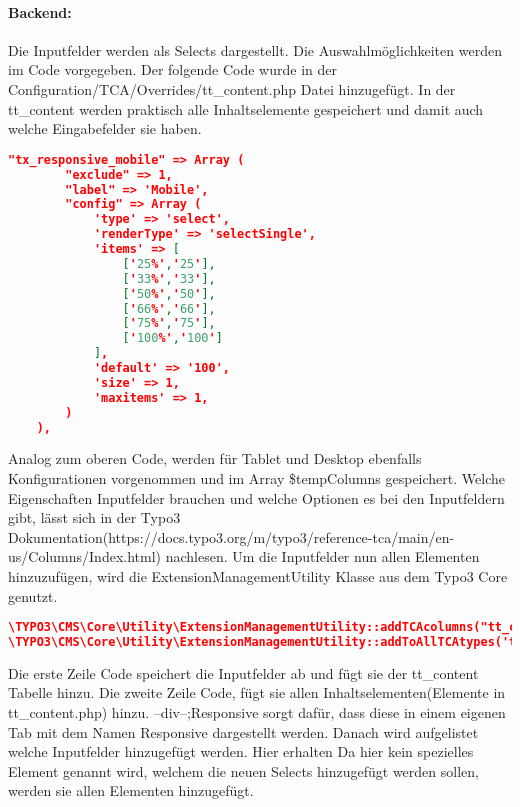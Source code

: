 \paragraph{Backend:} Die Inputfelder werden als Selects dargestellt. Die Auswahlmöglichkeiten werden im Code vorgegeben. Der folgende Code wurde in der Configuration/TCA/Overrides/tt\_content.php Datei hinzugefügt. In der tt\_content werden praktisch alle Inhaltselemente gespeichert und damit auch welche Eingabefelder sie haben.
\begin{lstlisting}[language=json,firstnumber=1]
"tx_responsive_mobile" => Array (
        "exclude" => 1,
        "label" => 'Mobile',
        "config" => Array (
            'type' => 'select',
            'renderType' => 'selectSingle',
            'items' => [
                ['25%','25'],
                ['33%','33'],
                ['50%','50'],
                ['66%','66'],
                ['75%','75'],
                ['100%','100']
            ],
            'default' => '100',
            'size' => 1,
            'maxitems' => 1,
        )
    ),
\end{lstlisting}
Analog zum oberen Code, werden für Tablet und Desktop ebenfalls Konfigurationen vorgenommen und im Array \$tempColumns gespeichert. Welche Eigenschaften Inputfelder brauchen und welche Optionen es bei den Inputfeldern gibt, lässt sich in der Typo3 Dokumentation(https://docs.typo3.org/m/typo3/\newline reference-tca/main/en-us/Columns/Index.html) nachlesen. Um die Inputfelder nun allen Elementen hinzuzufügen, wird die ExtensionManagementUtility Klasse aus dem Typo3 Core genutzt.
\begin{lstlisting}[language=json,firstnumber=1]
\TYPO3\CMS\Core\Utility\ExtensionManagementUtility::addTCAcolumns("tt_content",$tempColumns,1);
\TYPO3\CMS\Core\Utility\ExtensionManagementUtility::addToAllTCAtypes('tt_content','--div--;Responsive,tx_responsive_mobile,tx_responsive_tablet,tx_responsive_desktop','');
\end{lstlisting}

Die erste Zeile Code speichert die Inputfelder ab und fügt sie der tt\_content Tabelle hinzu. Die zweite Zeile Code, fügt sie allen Inhaltselementen(Elemente in tt\_content.php) hinzu. --div--;Responsive sorgt dafür, dass diese in einem eigenen Tab mit dem Namen Responsive dargestellt werden. Danach wird aufgelistet welche Inputfelder hinzugefügt werden. Hier erhalten Da hier kein spezielles Element genannt wird, welchem die neuen Selects hinzugefügt werden sollen, werden sie allen Elementen hinzugefügt.

